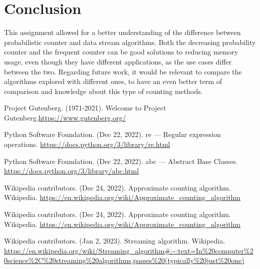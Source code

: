 \documentclass[...]{revdetua}
\begin{document}
\section{Conclusion}

This assignment allowed for a better understanding of the difference between probabilistic counter and data stream algorithms. Both the decreasing probability counter and the frequent counter can be good solutions to reducing memory usage, even though they have different applications, as the use cases differ between the two. Regarding future work, it would be relevant to compare the algorithms explored with different ones, to have an even better term of comparison and knowledge about this type of counting methods.

\begin{thebibliography}{9}

Project Gutenberg. (1971-2021). Welcome to Project Gutenberg.\url{https://www.gutenberg.org/}

Python Software Foundation. (Dec 22, 2022). re — Regular expression operations. \url{https://docs.python.org/3/library/re.html}

Python Software Foundation. (Dec 22, 2022). abc — Abstract Base Classes. \url{https://docs.python.org/3/library/abc.html}

Wikipedia contributors. (Dec 24, 2022). Approximate counting algorithm.  Wikipedia. \url{https://en.wikipedia.org/wiki/Approximate_counting_algorithm}

Wikipedia contributors. (Dec 24, 2022). Approximate counting algorithm.  Wikipedia. \url{https://en.wikipedia.org/wiki/Approximate_counting_algorithm}

Wikipedia contributors. (Jan 2, 2023). Streaming algorithm.  Wikipedia. \url{https://en.wikipedia.org/wiki/Streaming_algorithm#:~:text=In\%20computer\%20science\%2C\%20streaming\%20algorithms,passes\%20(typically\%20just\%20one)}

\end{thebibliography}

\end{document}
